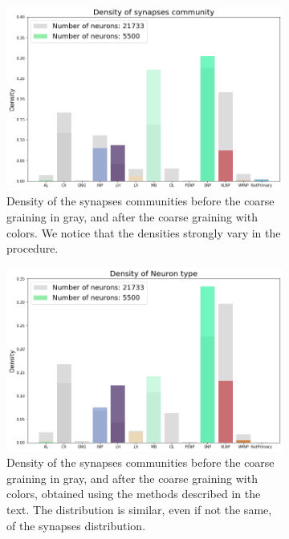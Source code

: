 \begin{figure}
    \centering
    \begin{subfigure}[t]{0.49\textwidth}
		\centering
		\includegraphics[width=\textwidth]{Images/Communities/Communities_after_graining.png}
		\caption{Density of the synapses communities before the coarse graining in gray, and 
		after the coarse graining with colors. We notice that the densities strongly vary in the 
		procedure.}
	\end{subfigure}
	\hfill
	\begin{subfigure}[t]{0.49\textwidth}
		\centering
		\includegraphics[width=\textwidth]{Images/Communities/density_neurons.png}
		\caption{Density of the synapses communities before the coarse graining in gray, and 
		after the coarse graining with colors, obtained using the methods described
		in the text. The distribution is similar,
		even if not the same, of the synapses distribution.}
	\end{subfigure}
	\caption{}
	\label{fig:com_evol}
\end{figure}

